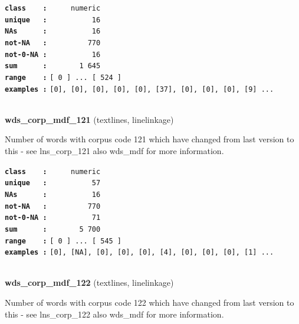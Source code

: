 \documentclass[]{article}
\begin{document}
\textbf{\texttt{class\ \ \ \ :}} \texttt{~~~~~numeric}\\
\textbf{\texttt{unique\ \ \ :}} \texttt{~~~~~~~~~~16}\\
\textbf{\texttt{NAs\ \ \ \ \ \ :}} \texttt{~~~~~~~~~~16}\\
\textbf{\texttt{not-NA\ \ \ :}} \texttt{~~~~~~~~~770}\\
\textbf{\texttt{not-0-NA\ :}} \texttt{~~~~~~~~~~16}\\
\textbf{\texttt{sum\ \ \ \ \ \ :}} \texttt{~~~~~~~1~645}\\
\textbf{\texttt{range\ \ \ \ :}}
\texttt{{[}\ 0\ {]}\ ...\ {[}\ 524\ {]}}\\
\textbf{\texttt{examples\ :}}
\texttt{{[}0{]},\ {[}0{]},\ {[}0{]},\ {[}0{]},\ {[}0{]},\ {[}37{]},\ {[}0{]},\ {[}0{]},\ {[}0{]},\ {[}9{]}\ ...}\\

~

\textbf{wds\_corp\_mdf\_121} (textlines, linelinkage)

Number of words with corpus code 121 which have changed from last
version to this - see lns\_corp\_121 also wds\_mdf for more information.

\textbf{\texttt{class\ \ \ \ :}} \texttt{~~~~~numeric}\\
\textbf{\texttt{unique\ \ \ :}} \texttt{~~~~~~~~~~57}\\
\textbf{\texttt{NAs\ \ \ \ \ \ :}} \texttt{~~~~~~~~~~16}\\
\textbf{\texttt{not-NA\ \ \ :}} \texttt{~~~~~~~~~770}\\
\textbf{\texttt{not-0-NA\ :}} \texttt{~~~~~~~~~~71}\\
\textbf{\texttt{sum\ \ \ \ \ \ :}} \texttt{~~~~~~~5~700}\\
\textbf{\texttt{range\ \ \ \ :}}
\texttt{{[}\ 0\ {]}\ ...\ {[}\ 545\ {]}}\\
\textbf{\texttt{examples\ :}}
\texttt{{[}0{]},\ {[}NA{]},\ {[}0{]},\ {[}0{]},\ {[}0{]},\ {[}4{]},\ {[}0{]},\ {[}0{]},\ {[}0{]},\ {[}1{]}\ ...}\\

~

\textbf{wds\_corp\_mdf\_122} (textlines, linelinkage)

Number of words with corpus code 122 which have changed from last
version to this - see lns\_corp\_122 also wds\_mdf for more information.
\end{document}
